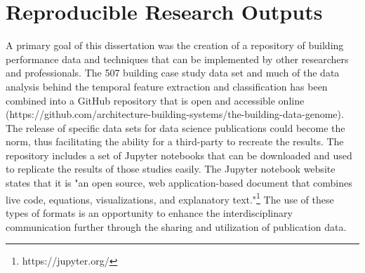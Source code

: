 \section{Reproducible Research Outputs}
\label{sec:reproducibleresearch}
A primary goal of this dissertation was the creation of a repository of building performance data and techniques that can be implemented by other researchers and professionals. The 507 building case study data set and much of the data analysis behind the temporal feature extraction and classification has been combined into a GitHub repository that is open and accessible online (https://github.com/architecture-building-systems/the-building-data-genome). The release of specific data sets for data science publications could become the norm, thus facilitating the ability for a third-party to recreate the results.  The repository includes a set of Jupyter notebooks that can be downloaded and used to replicate the results of those studies easily. The Jupyter notebook website states that it is "an open source, web application-based document that combines live code, equations, visualizations, and explanatory text."\footnote{https://jupyter.org/} The use of these types of formats is an opportunity to enhance the interdisciplinary communication further through the sharing and utilization of publication data. 





